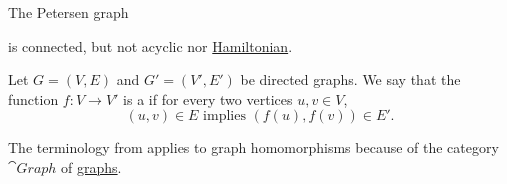 \begin{example}\label{ex:petersen_graph}\mcite\cite[347]{GondranMinoux1984Graphs}
  The Petersen graph
  \begin{alignedeq}\label{ex:petersen_graph/embedding}
    \iffalse\begin{mplibcode}
      u := 1cm;

      beginfig(1);
      input metapost/graphs;
      lax_bboxmargin := 2pt;

      for i = 1 upto 5:
      v[i] := thelabel("$\bullet$", dir(18 + i * 72) scaled u);
      v[5 + i] := thelabel("$\bullet$", dir(18 + i * 72) scaled 2u);
      endfor;

      for i = 1 upto 4:
      a[i] := straight_arc(v[5 + i], v[5 + i + 1]);
      a[5 + i] := straight_arc(v[i], v[5 + i]);
      endfor;

      a5 := straight_arc(v10, v6);
      a10 := straight_arc(v5, v10);

      a11 := straight_arc(v1, v3);
      a12 := straight_arc(v1, v4);
      a13 := straight_arc(v2, v4);
      a14 := straight_arc(v2, v5);
      a15 := straight_arc(v3, v5);

      draw_vertices(v);
      draw_edges(a);
      endfig;
    \end{mplibcode}\fi
  \end{alignedeq}
  is connected, but not acyclic nor \hyperref[def:graph_paths/hamiltonian_path]{Hamiltonian}.
\end{example}

\begin{definition}\label{def:graph_homomorphism}
  Let \( G = (V, E) \) and \( G' = (V', E') \) be directed graphs. We say that the function \( f: V \to V' \) is a  if for every two vertices \( u, v \in V \),
  \begin{equation*}
    (u, v) \in E \text{ implies } (f(u), f(v)) \in E'.
  \end{equation*}

  The terminology from  applies to graph homomorphisms because of the category \( \cat{Graph} \) of \hyperref[def:category_of_graphs]{graphs}.
\end{definition}

